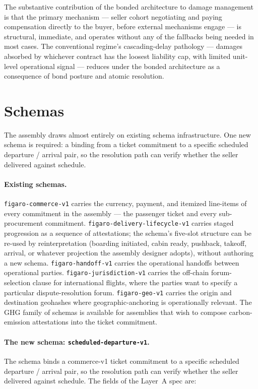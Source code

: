 \documentclass[11pt,a4paper]{article}
\theoremstyle{definition}
\theoremstyle{remark}
\begin{document}
The substantive contribution of the bonded architecture to damage
management is that the primary mechanism --- seller cohort
negotiating and paying compensation directly to the buyer, before
external mechanisms engage --- is structural, immediate, and
operates without any of the fallbacks being needed in most cases.
The conventional regime's cascading-delay pathology --- damages
absorbed by whichever contract has the loosest liability cap,
with limited unit-level operational signal
\citep{lan_clarke_barnhart_2006} --- reduces under the bonded
architecture as a consequence of bond posture and atomic
resolution.

\section{Schemas}
\label{sec:schemas}

The assembly draws almost entirely on existing schema
infrastructure. One new schema is required: a binding from a
ticket commitment to a specific scheduled departure / arrival
pair, so the resolution path can verify whether the seller
delivered against schedule.

\paragraph{Existing schemas.}
\texttt{figaro-commerce-v1} carries the currency, payment, and
itemized line-items of every commitment in the assembly --- the
passenger ticket and every sub-procurement commitment.
\texttt{figaro-delivery-lifecycle-v1} carries staged progression
as a sequence of attestations; the schema's five-slot structure
can be re-used by reinterpretation (boarding initiated, cabin
ready, pushback, takeoff, arrival, or whatever projection the
assembly designer adopts), without authoring a new schema.
\texttt{figaro-handoff-v1} carries the operational handoffs
between operational parties.
\texttt{figaro-jurisdiction-v1} carries the off-chain
forum-selection clause for international flights, where the
parties want to specify a particular dispute-resolution forum.
\texttt{figaro-geo-v1} carries the origin and destination
geohashes where geographic-anchoring is operationally relevant.
The GHG family of schemas is available for assemblies that wish
to compose carbon-emission attestations into the ticket
commitment.

\paragraph{The new schema: \texttt{scheduled-departure-v1}.}
The schema binds a commerce-v1 ticket commitment to a specific
scheduled departure / arrival pair, so the resolution path can
verify whether the seller delivered against schedule. The fields
of the Layer~A spec are:
\end{document}
